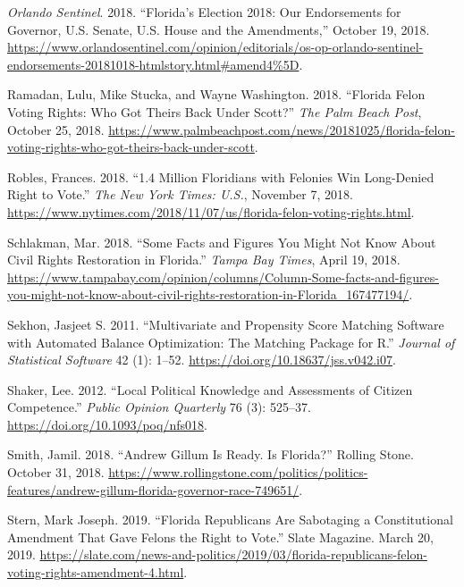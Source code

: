 \documentclass[
  12pt,
]{article}
\newlength{\cslhangindent}
\newenvironment{cslreferences}%
  {\setlength{\parindent}{0pt}%
  \everypar{\setlength{\hangindent}{\cslhangindent}}\ignorespaces}%
  {\par}
\begin{document}
\begin{cslreferences}
\leavevmode\hypertarget{ref-ORLANDOSENTINEL2018}{}%
\emph{Orlando Sentinel}. 2018. ``Florida's Election 2018: Our Endorsements for Governor, U.S. Senate, U.S. House and the Amendments,'' October 19, 2018. \url{https://www.orlandosentinel.com/opinion/editorials/os-op-orlando-sentinel-endorsements-20181018-htmlstory.html\#amend4\%5D}.

\leavevmode\hypertarget{ref-Ramadan2018}{}%
Ramadan, Lulu, Mike Stucka, and Wayne Washington. 2018. ``Florida Felon Voting Rights: Who Got Theirs Back Under Scott?'' \emph{The Palm Beach Post}, October 25, 2018. \url{https://www.palmbeachpost.com/news/20181025/florida-felon-voting-rights-who-got-theirs-back-under-scott}.

\leavevmode\hypertarget{ref-Robles2018}{}%
Robles, Frances. 2018. ``1.4 Million Floridians with Felonies Win Long-Denied Right to Vote.'' \emph{The New York Times: U.S.}, November 7, 2018. \url{https://www.nytimes.com/2018/11/07/us/florida-felon-voting-rights.html}.

\leavevmode\hypertarget{ref-Schlakman2018}{}%
Schlakman, Mar. 2018. ``Some Facts and Figures You Might Not Know About Civil Rights Restoration in Florida.'' \emph{Tampa Bay Times}, April 19, 2018. \url{https://www.tampabay.com/opinion/columns/Column-Some-facts-and-figures-you-might-not-know-about-civil-rights-restoration-in-Florida_167477194/}.

\leavevmode\hypertarget{ref-Sekhon2011}{}%
Sekhon, Jasjeet S. 2011. ``Multivariate and Propensity Score Matching Software with Automated Balance Optimization: The Matching Package for R.'' \emph{Journal of Statistical Software} 42 (1): 1--52. \url{https://doi.org/10.18637/jss.v042.i07}.

\leavevmode\hypertarget{ref-Shaker2012}{}%
Shaker, Lee. 2012. ``Local Political Knowledge and Assessments of Citizen Competence.'' \emph{Public Opinion Quarterly} 76 (3): 525--37. \url{https://doi.org/10.1093/poq/nfs018}.

\leavevmode\hypertarget{ref-Smith2018}{}%
Smith, Jamil. 2018. ``Andrew Gillum Is Ready. Is Florida?'' Rolling Stone. October 31, 2018. \url{https://www.rollingstone.com/politics/politics-features/andrew-gillum-florida-governor-race-749651/}.

\leavevmode\hypertarget{ref-Stern2019}{}%
Stern, Mark Joseph. 2019. ``Florida Republicans Are Sabotaging a Constitutional Amendment That Gave Felons the Right to Vote.'' Slate Magazine. March 20, 2019. \url{https://slate.com/news-and-politics/2019/03/florida-republicans-felon-voting-rights-amendment-4.html}.


\end{cslreferences}
\end{document}

